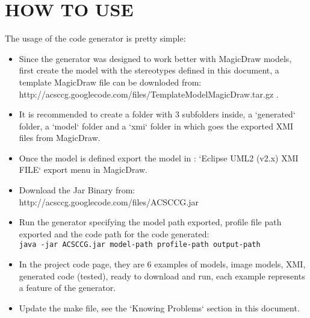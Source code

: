 \section{HOW TO USE}

The usage of the code generator is pretty simple:

\begin{itemize}
\item Since the generator was designed to work better with MagicDraw models,
first create the model with the stereotypes defined in this document, a template
MagicDraw file can be downloded from:\\
http://acsccg.googlecode.com/files/TemplateModelMagicDraw.tar.gz .
\item It is recommended to create a folder with 3 subfolders inside, a
`generated` folder, a `model` folder and a `xmi` folder in which goes the
exported XMI files from MagicDraw.
\item Once the model is defined export the model in : `Eclipse UML2 (v2.x) XMI
FILE` export menu in MagicDraw.
\item Download the Jar Binary from:\\
http://acsccg.googlecode.com/files/ACSCCG.jar
\item Run the generator specifying the model path exported, profile file path
exported and the code path for the code generated:\\ 
\verb+java -jar ACSCCG.jar model-path profile-path output-path+
\item In the project code page, they are 6 examples of models, image models,
XMI, generated code (tested), ready to download and run, each example represents
a feature of the generator.
\item Update the make file, see the `Knowing Problems` section in this document.
\end{itemize} 
